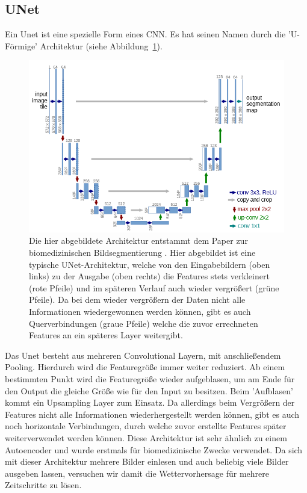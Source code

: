 \subsection{UNet}
\label{kapitelUNet}
Ein Unet ist eine spezielle Form eines CNN. Es hat seinen Namen durch die 'U-Förmige' Architektur (siehe Abbildung~\ref{imgUNetA}).
\begin{figure}[h]
	\centering
	\includegraphics[width=\linewidth]{pics/UNet_Biomedical}
	\caption[UNet aus Paper von O. Ronneberger, P. Fischer und T. Brox]{Die hier abgebildete Architektur entstammt dem Paper zur biomedizinischen Bildsegmentierung \cite{DBLP:journals/corr/RonnebergerFB15}. Hier abgebildet ist eine typische UNet-Architektur, welche von den Eingabebildern (oben links) zu der Ausgabe (oben rechts) die Features stets verkleinert (rote Pfeile) und im späteren Verlauf auch wieder vergrößert (grüne Pfeile). Da bei dem wieder vergrößern der Daten nicht alle Informationen wiedergewonnen werden können, gibt es auch Querverbindungen (graue Pfeile) welche die zuvor errechneten Features an ein späteres Layer weitergibt.}
	\label{imgUNetA}
\end{figure}

Das Unet besteht aus mehreren Convolutional Layern, mit anschließendem Pooling. Hierdurch wird die Featuregröße immer weiter reduziert. Ab einem bestimmten Punkt wird die Featuregröße wieder aufgeblasen, um am Ende für den Output die gleiche Größe wie für den Input zu besitzen. Beim 'Aufblasen' kommt ein Upsampling Layer zum Einsatz. Da allerdings beim Vergrößern der Features nicht alle Informationen wiederhergestellt werden können, gibt es auch noch horizontale Verbindungen, durch welche zuvor erstellte Features später weiterverwendet werden können.
Diese Architektur ist sehr ähnlich zu einem Autoencoder und wurde erstmals für biomedizinische Zwecke verwendet. Da sich mit dieser Architektur mehrere Bilder einlesen und auch beliebig viele Bilder ausgeben lassen, versuchen wir damit die Wettervorhersage für mehrere Zeitschritte zu lösen.

